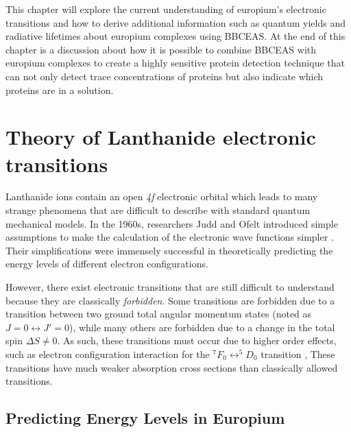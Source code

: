 This chapter will explore the current understanding of europium's electronic
transitions and how to derive additional information such as quantum yields
and radiative lifetimes about europium complexes using \ac{BBCEAS}. At the
end of this chapter is a discussion about how it is possible to combine
\ac{BBCEAS} with europium complexes to create a highly sensitive protein
detection technique that can not only detect trace concentrations of proteins
but also indicate which proteins are in a solution.



\section{Theory of Lanthanide electronic transitions}\label{sec:theory_eu}

Lanthanide ions contain an open \textsl{4f} electronic orbital which leads to
many strange phenomena that are difficult to describe with standard quantum
mechanical models\cite{Wybourne:1968ez}. In the 1960s, researchers Judd and
Ofelt introduced simple assumptions to make the calculation of the electronic
wave functions simpler \cite{Judd:1962uq,Ofelt:1962kd}.  Their simplifications
were immensely successful in theoretically predicting the energy levels of
different electron configurations.

However, there exist electronic transitions that are still difficult to
understand because they are classically \emph{forbidden}. Some transitions are
forbidden due to a transition between two ground total angular momentum states
(noted as $ J=0 \leftrightarrow J'=0 $), while many others are forbidden due to
a change in the total spin $\Delta S \neq 0$. As such, these transitions must
occur due to higher order effects, such as electron configuration interaction
for the $^7F_0 \leftrightarrow ^5D_0$ transition \cite{Jankowski:1981es}, These
transitions have much weaker absorption cross sections than classically allowed
transitions.



\subsection{Predicting Energy Levels in Europium}\label{subsec:predict_eu}

